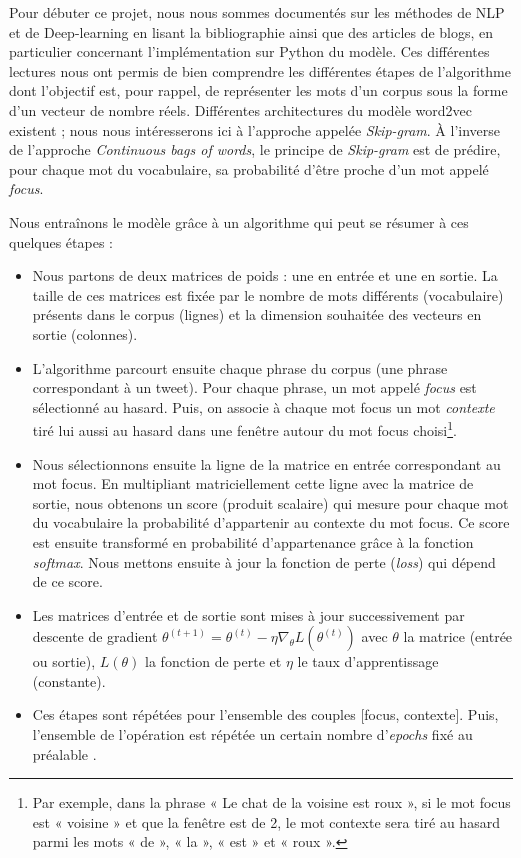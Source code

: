 \documentclass[11pt,french,french]{article}
\let\rmarkdownfootnote\footnote%
\def\footnote{\protect\rmarkdownfootnote}
\begin{document}
Pour débuter ce projet, nous nous sommes documentés sur les méthodes de
NLP et de Deep-learning en lisant la bibliographie ainsi que des
articles de blogs, en particulier concernant l'implémentation sur Python
du modèle. Ces différentes lectures nous ont permis de bien comprendre
les différentes étapes de l'algorithme dont l'objectif est, pour rappel,
de représenter les mots d'un corpus sous la forme d'un vecteur de nombre
réels. Différentes architectures du modèle word2vec existent ; nous nous
intéresserons ici à l'approche appelée \emph{Skip-gram}. À l'inverse de
l'approche \emph{Continuous bags of words}, le principe de
\emph{Skip-gram} est de prédire, pour chaque mot du vocabulaire, sa
probabilité d'être proche d'un mot appelé \emph{focus}.

Nous entraînons le modèle grâce à un algorithme qui peut se résumer à
ces quelques étapes :

\begin{itemize}
\item
  Nous partons de deux matrices de poids : une en entrée et une en
  sortie. La taille de ces matrices est fixée par le nombre de mots
  différents (vocabulaire) présents dans le corpus (lignes) et la
  dimension souhaitée des vecteurs en sortie (colonnes).
\item
  L'algorithme parcourt ensuite chaque phrase du corpus (une phrase
  correspondant à un tweet). Pour chaque phrase, un mot appelé
  \emph{focus} est sélectionné au hasard. Puis, on associe à chaque mot
  focus un mot \emph{contexte} tiré lui aussi au hasard dans une fenêtre
  autour du mot focus choisi\footnote{Par exemple, dans la phrase « Le
    chat de la voisine est roux », si le mot focus est « voisine » et
    que la fenêtre est de 2, le mot contexte sera tiré au hasard parmi
    les mots « de », « la », « est » et « roux ».}.
\item
  Nous sélectionnons ensuite la ligne de la matrice en entrée
  correspondant au mot focus. En multipliant matriciellement cette ligne
  avec la matrice de sortie, nous obtenons un score (produit scalaire)
  qui mesure pour chaque mot du vocabulaire la probabilité d'appartenir
  au contexte du mot focus. Ce score est ensuite transformé en
  probabilité d'appartenance grâce à la fonction \emph{softmax}. Nous
  mettons ensuite à jour la fonction de perte (\emph{loss}) qui dépend
  de ce score.
\item
  Les matrices d'entrée et de sortie sont mises à jour successivement
  par descente de gradient
  \(\theta^{(t+1)} = \theta^{(t)} - \eta \nabla_\theta L(\theta^{(t)})\)
  avec \(\theta\) la matrice (entrée ou sortie), \(L(\theta)\) la
  fonction de perte et \(\eta\) le taux d'apprentissage (constante).
\item
  Ces étapes sont répétées pour l'ensemble des couples {[}focus,
  contexte{]}. Puis, l'ensemble de l'opération est répétée un certain
  nombre d'\emph{epochs} fixé au préalable .
\end{itemize}
\end{document}
